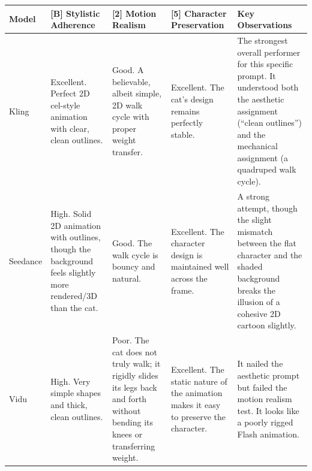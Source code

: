 \documentclass[sigconf]{acmart}
\begin{document}
\begin{table}[H]
    \centering
    \renewcommand{\arraystretch}{1.3}
    \begin{tabularx}{\textwidth}{| l | >{\raggedright\arraybackslash}X | >{\raggedright\arraybackslash}X | >{\raggedright\arraybackslash}X | >{\raggedright\arraybackslash}X |}
        \hline
        \textbf{Model} & \textbf{[B] Stylistic Adherence}                                                                              & \textbf{[2] Motion Realism}                                                                                                    & \textbf{[5] Character Preservation}                                                                                              & \textbf{Key Observations}                                                                                                                                                          \\\hline
        Kling          & Excellent. Perfect 2D cel-style animation with clear, clean outlines.                                         & Good. A believable, albeit simple, 2D walk cycle with proper weight transfer.                                                  & Excellent. The cat's design remains perfectly stable.                                                                            & The strongest overall performer for this specific prompt. It understood both the aesthetic assignment (``clean outlines'') and the mechanical assignment (a quadruped walk cycle). \\\hline
        Seedance       & High. Solid 2D animation with outlines, though the background feels slightly more rendered/3D than the cat.   & Good. The walk cycle is bouncy and natural.                                                                                    & Excellent. The character design is maintained well across the frame.                                                             & A strong attempt, though the slight mismatch between the flat character and the shaded background breaks the illusion of a cohesive 2D cartoon slightly.                           \\\hline
        Vidu           & High. Very simple shapes and thick, clean outlines.                                                           & Poor. The cat does not truly walk; it rigidly slides its legs back and forth without bending its knees or transferring weight. & Excellent. The static nature of the animation makes it easy to preserve the character.                                           & It nailed the aesthetic prompt but failed the motion realism test. It looks like a poorly rigged Flash animation.                                                                  \\\hline

\end{tabularx}
\end{table}
\end{document}
